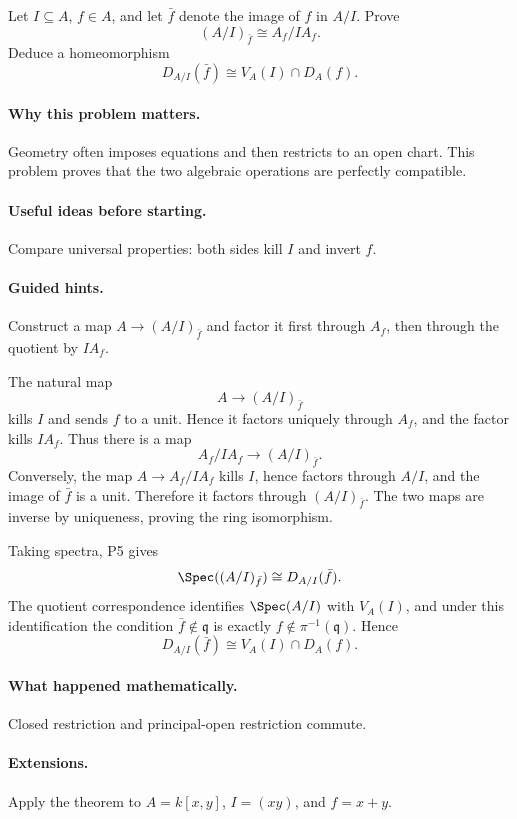 \begin{problem}
Let $I\subseteq A$, $f\in A$, and let $\bar f$ denote the image of $f$ in $A/I$.
Prove
\[
(A/I)_{\bar f}\cong A_f/IA_f.
\]
Deduce a homeomorphism
\[
D_{A/I}(\bar f)\cong V_A(I)\cap D_A(f).
\]
\end{problem}

\paragraph{Why this problem matters.}
Geometry often imposes equations and then restricts to an open chart.  This problem proves
that the two algebraic operations are perfectly compatible.

\paragraph{Useful ideas before starting.}
Compare universal properties: both sides kill $I$ and invert $f$.

\paragraph{Guided hints.}
Construct a map $A\to(A/I)_{\bar f}$ and factor it first through $A_f$, then through the
quotient by $IA_f$.

\begin{solution}
The natural map
\[
A\longrightarrow(A/I)_{\bar f}
\]
kills $I$ and sends $f$ to a unit.  Hence it factors uniquely through $A_f$, and the
factor kills $IA_f$.  Thus there is a map
\[
A_f/IA_f\longrightarrow(A/I)_{\bar f}.
\]
Conversely, the map $A\to A_f/IA_f$ kills $I$, hence factors through $A/I$, and the image
of $\bar f$ is a unit.  Therefore it factors through $(A/I)_{\bar f}$.  The two maps are
inverse by uniqueness, proving the ring isomorphism.

Taking spectra, P5 gives
\[
\Spec((A/I)_{\bar f})\cong D_{A/I}(\bar f).
\]
The quotient correspondence identifies $\Spec(A/I)$ with $V_A(I)$, and under this
identification the condition $\bar f\notin\mathfrak q$ is exactly
$f\notin\pi^{-1}(\mathfrak q)$.  Hence
\[
D_{A/I}(\bar f)\cong V_A(I)\cap D_A(f).
\]
\end{solution}

\paragraph{What happened mathematically.}
Closed restriction and principal-open restriction commute.

\paragraph{Extensions.}
Apply the theorem to $A=k[x,y]$, $I=(xy)$, and $f=x+y$.

